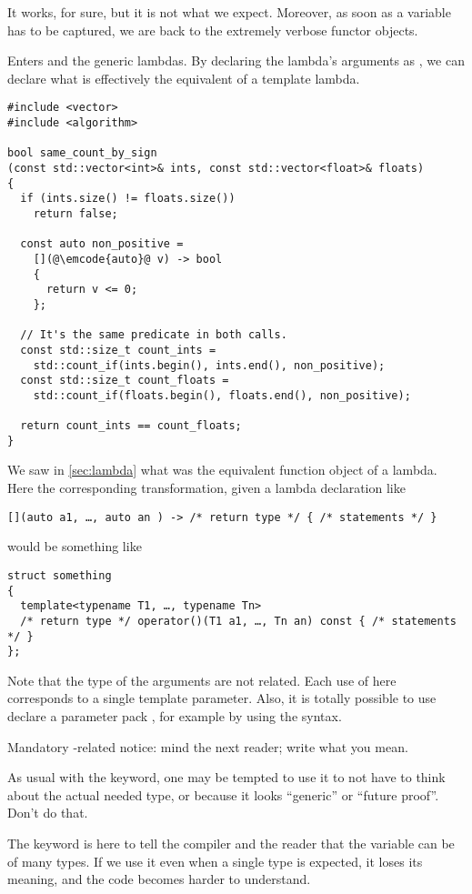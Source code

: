 It works, for sure, but it is not what we expect. Moreover, as soon as
a variable has to be captured, we are back to the extremely verbose
functor objects.

\bigskip

Enters  and the generic lambdas. By declaring the lambda's
arguments as , we can declare what is effectively the
equivalent of a template lambda.

\begin{lstlisting}
#include <vector>
#include <algorithm>

bool same_count_by_sign
(const std::vector<int>& ints, const std::vector<float>& floats)
{
  if (ints.size() != floats.size())
    return false;

  const auto non_positive =
    [](@\emcode{auto}@ v) -> bool
    {
      return v <= 0;
    };

  // It's the same predicate in both calls.
  const std::size_t count_ints =
    std::count_if(ints.begin(), ints.end(), non_positive);
  const std::size_t count_floats =
    std::count_if(floats.begin(), floats.end(), non_positive);

  return count_ints == count_floats;
}
\end{lstlisting}

We saw in \ref{sec:lambda} what was the equivalent function object of
a lambda. Here the corresponding transformation, given a lambda
declaration like

\begin{lstlisting}
[](auto a1, …, auto an ) -> /* return type */ { /* statements */ }
\end{lstlisting}

would be something like

\begin{lstlisting}
struct something
{
  template<typename T1, …, typename Tn>
  /* return type */ operator()(T1 a1, …, Tn an) const { /* statements */ }
};
\end{lstlisting}

Note that the type of the arguments are not related. Each use of
 here corresponds to a single template parameter. Also, it
is totally possible to use declare a parameter pack
, for example by using the 
syntax.

\begin{guideline}
Mandatory -related notice: mind the next reader; write what
you mean.

\bigskip

As usual with the  keyword, one may be tempted to use it to
not have to think about the actual needed type, or because it looks
``generic'' or ``future proof''. Don't do that.

The  keyword is here to tell the compiler and the reader
that the variable can be of many types. If we use it even when a
single type is expected, it loses its meaning, and the code becomes
harder to understand.
\end{guideline}
